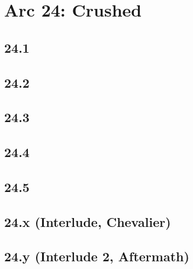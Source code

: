 \part{Arc 24: Crushed}
 \chapter{24.1}
 \chapter{24.2}
 \chapter{24.3}
 \chapter{24.4}
 \chapter{24.5}
 \chapter{24.x (Interlude, Chevalier)}
 \chapter{24.y (Interlude 2, Aftermath)}








